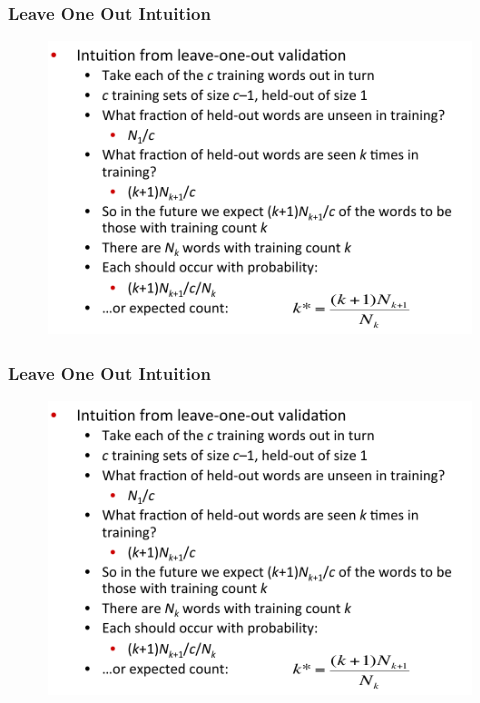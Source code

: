 \documentclass{beamer}
\begin{document}
\begin{frame}\frametitle{Leave One Out Intuition}
\begin{figure}
\includegraphics[width=0.9\linewidth]{figure/good_turing_loo_intuition.pdf}
\label{fig:good_turing_loo_intuition}
\end{figure}
\end{frame}


\begin{frame}\frametitle{Leave One Out Intuition}
\begin{figure}
\includegraphics[width=0.9\linewidth]{figure/good_turing_loo_intuition.pdf}
\label{fig:good_turing_loo_intuition}
\end{figure}
\end{frame}
\end{document}
